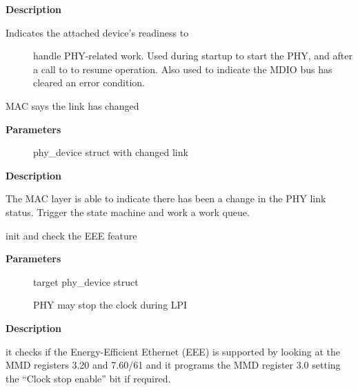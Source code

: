 \documentclass[a4paper,8pt,english]{sphinxmanual}
\begin{document}
\textbf{Description}
\begin{description}
\item[{Indicates the attached device's readiness to}] \leavevmode
handle PHY-related work.  Used during startup to start the
PHY, and after a call to {\hyperref[networking/kapi:c.phy_stop]{\emph{}}} to resume operation.
Also used to indicate the MDIO bus has cleared an error
condition.

\end{description}

\begin{fulllineitems}
\label{networking/kapi:c.phy_mac_interrupt}
MAC says the link has changed

\end{fulllineitems}


\textbf{Parameters}
\begin{description}
\item[{}] \leavevmode
phy\_device struct with changed link

\end{description}

\textbf{Description}

The MAC layer is able to indicate there has been a change in the PHY link
status. Trigger the state machine and work a work queue.

\begin{fulllineitems}
\label{networking/kapi:c.phy_init_eee}
init and check the EEE feature

\end{fulllineitems}


\textbf{Parameters}
\begin{description}
\item[{}] \leavevmode
target phy\_device struct

\item[{}] \leavevmode
PHY may stop the clock during LPI

\end{description}

\textbf{Description}

it checks if the Energy-Efficient Ethernet (EEE)
is supported by looking at the MMD registers 3.20 and 7.60/61
and it programs the MMD register 3.0 setting the ``Clock stop enable''
bit if required.
\end{document}
